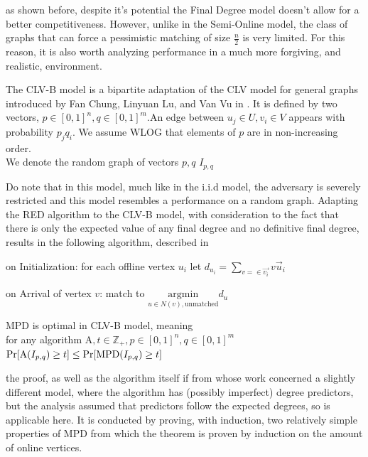 as shown before, despite it's potential the Final Degree model doesn't allow for a better competitiveness. However, unlike in the Semi-Online model, the class of graphs that can force a pessimistic matching of size $\frac{n}{2}$ is very limited. For this reason, it is also worth analyzing performance in a much more forgiving, and realistic, environment.

\begin{definition}
	\label{CLV-B Model}
	The CLV-B model is a bipartite adaptation of the CLV model for general graphs introduced by Fan Chung, Linyuan Lu, and Van Vu in \cite{clv-b}. It is defined by two vectors, $p\in[0,1]^n,q\in[0,1]^m$.An edge between $u_j\in U,v_i\in V$ appears with probability $p_jq_i$. 
	We assume WLOG that elements of $p$ are in non-increasing order.\\
	We denote the random graph of vectors $p,q$ $I_{p,q}$
\end{definition}
Do note that in this model, much like in the i.i.d model, the adversary is severely restricted and this model resembles a performance on a random graph.
Adapting the RED algorithm to the CLV-B model, with consideration to the fact that there is only the expected value of any final degree and no definitive final degree, results in the following algorithm, described in \cite{obmDegree}
\begin{algorithm}
	\caption{MinPredictedDegree - MPD}
	\label{alg:effective-deg-rand-clv}
	\begin{algorithmic}
		\item on Initialization: for each offline vertex $u_i$ let $d_{u_i}=\sum\limits_{v=\in\vec{v_i}}v\vec{u}_i$
		\item on Arrival of vertex $v$: match to $\underset{u\in N(v),\text{unmatched}}{\mathrm{argmin}}d_u$
	\end{algorithmic}
\end{algorithm}
\begin{theorem}
	\label{thm:deg-opt}
	MPD is optimal in CLV-B model, meaning\\
	for any algorithm $\mathrm{A}, t\in\mathbb{Z}_{+},p\in[0,1]^n,q\in[0,1]^m$ $\Pr[\mathrm{A}(I_{p,q})\geq t]\leq \Pr[\mathrm{MPD}(I_{p,q})\geq t]$
\end{theorem}

the proof, as well as the algorithm itself if from \cite{obmDegree} whose work concerned a slightly different model, where the algorithm has (possibly imperfect) degree predictors, but the analysis assumed that predictors follow the expected degrees, so is applicable here. It is conducted by proving, with induction, two relatively simple properties of MPD from which the theorem is proven by induction on the amount of online vertices.

